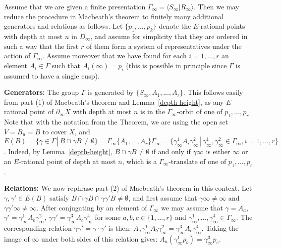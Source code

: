 \documentclass{article}[12pt]
\begin{document}
Assume that we are given a finite presentation $\Gamma_\infty= \langle S_\infty \vert R_\infty \rangle$. Then we may reduce the procedure in Macbeath's theorem to finitely many additional generators and relations as follows. 
Let $\{p_1,...,p_k\}$ denote the $E$-rational points with depth at most $n$ in $D_\infty$, and assume for simplicity that they are ordered in such a way that the first $r$ of them form a system of representatives under the action of $\Gamma_\infty$. Assume moreover that we have found for each $i=1,...,r$ an element $A_i \in \Gamma$ such that $A_i(\infty)=p_i$ (this is possible in principle since $\Gamma$ is assumed to have a single cusp).

\medskip

{\bf Generators:} The group $\Gamma$ is generated by $\{ S_\infty,A_1,...,A_r \}$. This follows easily from part (1) of Macbeath's theorem and Lemma~\ref{depth-height}, as any $E$-rational point of $\partial_\infty X$ with depth at most $n$ is in the $\Gamma_\infty$-orbit of one of $p_1,...,p_r$. Note that with the notation from the Theorem, we are using the open set $V=B_u=B$ to cover $X$, and  $E(B)=\{ \gamma \in \Gamma \, | \, B \cap \gamma B \neq \emptyset \}= \Gamma_\infty \{ A_1,...,A_r \} \Gamma_\infty =\{ \gamma_\infty^1 A_i \gamma_\infty^2\, | \, \gamma_\infty^1,\gamma_\infty^2 \in \Gamma_\infty, i=1,...,r \}$. Indeed, by Lemma~\ref{depth-height}, $B \cap \gamma B \neq \emptyset$ if and only if $\gamma \infty$  is either $\infty$ or an $E$-rational point of depth at most $n$, which is a $\Gamma_\infty$-translate of one of $p_1,...,p_r$. 

\medskip

{\bf Relations:} We now rephrase part (2) of Macbeath's theorem in this context. Let $\gamma, \gamma' \in E(B)$ satisfy $B \cap \gamma B \cap \gamma \gamma' B \neq \emptyset$, and first assume that $\gamma \infty \neq \infty$ and $\gamma \gamma' \infty \neq \infty$. After conjugating by an element of $\Gamma_\infty$ we may assume that $\gamma=A_a$, $\gamma'=\gamma_\infty^1 A_b \gamma_\infty^2$, $\gamma \gamma'=\gamma_\infty^3 A_c \gamma_\infty^4$ for some $a,b,c \in \{ 1,...,r \}$ and $\gamma_\infty^1,...,\gamma_\infty^4 \in \Gamma_\infty$. The corresponding relation $\gamma \gamma'=\gamma \cdot \gamma'$ is then: $A_a \gamma_\infty^1 A_b \gamma_\infty^2=\gamma_\infty^3 A_c \gamma_\infty^4$. Taking the image of $\infty$ under both sides of this relation gives: $A_a(\gamma_\infty^1 p_b)=\gamma_\infty^3 p_c$. 
\end{document}
